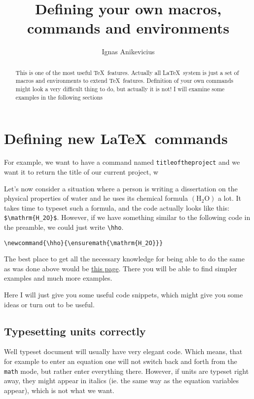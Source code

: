 \documentclass{scrartcl}
\title{Defining your own macros, commands and environments}
\author{Ignas Anikevicius}
\newcommand{\hho}{\ensuremath{\mathrm{H_2O}}}
\begin{document}
\maketitle

\begin{abstract}
    This is one of the most useful \TeX\ features. Actually all \LaTeX\ system
    is just a set of macros and environments to extend \TeX\ features.
    Definition of your own commands might look a very difficult thing to do, but
    actually it is not! I will examine some examples in the following sections
\end{abstract}

\tableofcontents

\section{Defining new \LaTeX\ commands}

For example, we want to have a command named \verb|titleoftheproject| and we
want it to return the title of our current project, w

Let's now consider a situation where a person is writing a dissertation on the
physical properties of water and he uses its chemical formula $\left( \hho
\right)$ a lot. It takes time to typeset such a formula, and the code actually
looks like this: \verb|$\mathrm{H_2O}$|. However, if we have
something similar to the following code in the preamble, we could just write
\verb|\hho|.
\begin{lstlisting}
\newcommand{\hho}{\ensuremath{\mathrm{H_2O}}}
\end{lstlisting}

The best place to get all the necessary knowledge for being able to do the same
as was done above would be 
\href{https://secure.wikimedia.org/wikibooks/en/wiki/LaTeX/Customizing_LaTeX#New_commands}{this
page}. There you will be able to find simpler examples and much more examples.

Here I will just give you some useful code snippets, which might give you some
ideas or turn out to be useful.

\subsection{Typesetting units correctly}

Well typeset document will usually have very elegant code. Which means, that for
example to enter an equation one will not switch back and forth from the
\verb|math| mode, but rather enter everything there. However, if units are
typeset right away, they might appear in italics (ie. the same way as the
equation variables appear), which is not what we want.
\end{document}
